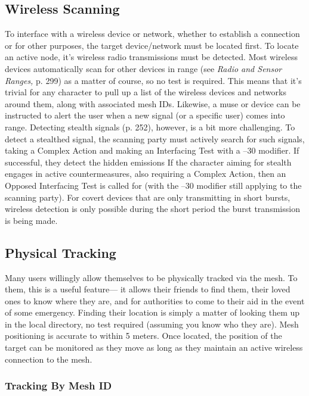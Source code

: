 \subsection{Wireless Scanning}

To interface with a wireless device or network, whether 
to establish a connection or for other purposes, the 
target device/network must be located first. To locate 
an active node, it's wireless radio transmissions must be 
detected. Most wireless devices automatically scan for 
other devices in range (see \textit{Radio and Sensor Ranges,} p. 
299) as a matter of course, so no test is required. This 
means that it's trivial for any character to pull up a 
list of the wireless devices and networks around them, 
along with associated mesh IDs. Likewise, a muse or 
device can be instructed to alert the user when a new 
signal (or a specific user) comes into range.
Detecting stealth signals (p. 252), however, is a bit 
more challenging. To detect a stealthed signal, the scanning
party must actively search for such signals, taking
a Complex Action and making an Interfacing Test with 
a –30 modifier. If successful, they detect the hidden emissions
If the character aiming for stealth engages in active
countermeasures, also requiring a Complex Action, then 
an Opposed Interfacing Test is called for (with the –30 
modifier still applying to the scanning party).
For covert devices that are only transmitting in 
short bursts, wireless detection is only possible during 
the short period the burst transmission is being made.

\subsection{Physical Tracking}

Many users willingly allow themselves to be physically 
tracked via the mesh. To them, this is a useful feature—
it allows their friends to find them, their loved ones to 
know where they are, and for authorities to come to 
their aid in the event of some emergency. Finding their 
location is simply a matter of looking them up in the 
local directory, no test required (assuming you know 
who they are). Mesh positioning is accurate to within 
5 meters. Once located, the position of the target can 
be monitored as they move as long as they maintain 
an active wireless connection to the mesh.

\subsubsection{Tracking By Mesh ID}

